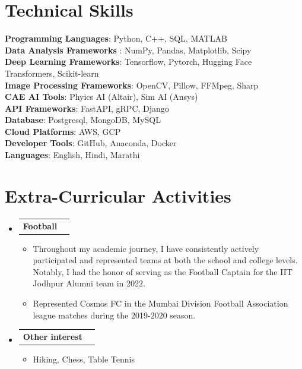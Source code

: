 \documentclass[letterpaper,11pt]{article}
\makeatletter
\newcommand{\resumeItem}[1]{
  \item\small{
    {#1 \vspace{-2pt}}
  }
}
\newcommand{\resumeProjectHeading}[2]{
    \item
    \begin{tabular*}{1.001\textwidth}{l@{\extracolsep{\fill}}r}
      \small#1 & \textbf{\small #2}\\
    \end{tabular*}\vspace{0pt}
}
\newcommand{\resumeSubHeadingListStart}{\begin{itemize}[leftmargin=0.0in, label={}]}
\newcommand{\resumeSubHeadingListEnd}{\end{itemize}}
\newcommand{\resumeItemListStart}{\begin{itemize}}
\newcommand{\resumeItemListEnd}{\end{itemize}\vspace{-5pt}}
\makeatother
\begin{document}
\section{Technical Skills}
 \begin{itemize}[leftmargin=0.15in, label={}]
    \small{\item{
     \textbf{Programming Languages}{: Python, C++, SQL, MATLAB} \\
     \vspace{2pt}
     \textbf{Data Analysis Frameworks} {: NumPy, Pandas, Matplotlib, Scipy} \\
     \vspace{2pt}
     \textbf{Deep Learning Frameworks}{: Tensorflow, Pytorch, Hugging Face Transformers, Scikit-learn} \\
     \vspace{2pt}
     \textbf{Image Processing Frameworks}{: OpenCV, Pillow, FFMpeg, Sharp} \\
     \vspace{2pt}
     \textbf{CAE AI Tools}{: Phyics AI (Altair), Sim AI (Ansys)} \\
     \vspace{2pt}
     \textbf{API Frameworks}{: FastAPI, gRPC, Django} \\
     \vspace{2pt}
     \textbf{Database}{: Postgresql, MongoDB, MySQL} \\
     \vspace{2pt}
     \textbf{Cloud Platforms}{: AWS, GCP} \\
     \vspace{2pt}
     \textbf{Developer Tools}{: GitHub, Anaconda, Docker} \\
     \vspace{2pt}
     \textbf{Languages}{: English, Hindi, Marathi} \\
    }}
 \end{itemize}
 \vspace{-10pt}
 
\section{Extra-Curricular Activities}
    \vspace{-5pt}
    \resumeSubHeadingListStart
      \resumeProjectHeading
          {\textbf{Football} \emph{}}{}
          \resumeItemListStart
            \resumeItem{Throughout my academic journey, I have consistently actively participated and represented teams at both the school and college levels. Notably, I had the honor of serving as the Football Captain for the IIT Jodhpur Alumni team in 2022.}
            \resumeItem{Represented Cosmos FC in the Mumbai Division Football Association league matches during the 2019-2020 season.}
          \resumeItemListEnd
          \vspace{-13pt}
      \resumeProjectHeading
          {\textbf{Other interest} \emph{}}{}
          \resumeItemListStart
            \resumeItem{Hiking, Chess, Table Tennis}
          \resumeItemListEnd
          \vspace{-13pt}
    \resumeSubHeadingListEnd
\vspace{-8pt}
\end{document}
